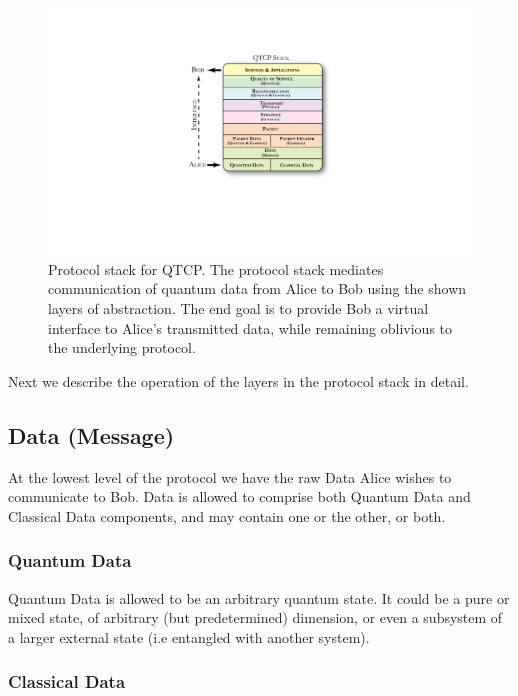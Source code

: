 \documentclass[aps,rmp,twocolumn,amsmath,amssymb,nofootinbib,superscriptaddress]{revtex4}
\begin{document}
\begin{figure}[!htb]
\includegraphics[width=\columnwidth]{stack}
\caption{Protocol stack for QTCP. The protocol stack mediates communication of quantum data from Alice to Bob using the shown layers of abstraction. The end goal is to provide Bob a virtual interface to Alice's transmitted data, while remaining oblivious to the underlying protocol.} \label{fig:stack}
\end{figure}

Next we describe the operation of the layers in the protocol stack in detail.

%
%

\subsection{Data (Message)}

At the lowest level of the protocol we have the raw {\sc Data} Alice wishes to communicate to Bob. {\sc Data} is allowed to comprise both {\sc Quantum Data} and {\sc Classical Data} components, and may contain one or the other, or both.

%
%

\subsubsection{Quantum Data}

{\sc Quantum Data} is allowed to be an arbitrary quantum state. It could be a pure or mixed state, of arbitrary (but predetermined) dimension, or even a subsystem of a larger external state (i.e entangled with another system).

%
%

\subsubsection{Classical Data}
\end{document}
